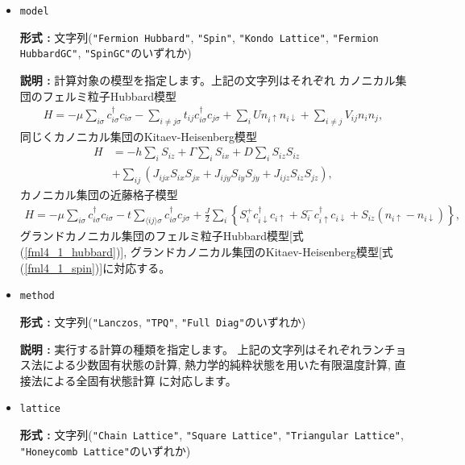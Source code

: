 \begin{itemize}

\item \verb|model|

{\bf 形式 :} 文字列(\verb|"Fermion Hubbard"|, \verb|"Spin"|, \verb|"Kondo Lattice"|, 
\verb|"Fermion HubbardGC"|, \verb|"SpinGC"|のいずれか)

{\bf 説明 :} 計算対象の模型を指定します。上記の文字列はそれぞれ
カノニカル集団のフェルミ粒子Hubbard模型
\begin{align}
H = - \mu \sum_{i \sigma} c^\dagger_{i \sigma} c_{i \sigma} 
- \sum_{i \neq j \sigma} t_{i j} c^\dagger_{i \sigma} c_{j \sigma} 
+ \sum_{i} U n_{i \uparrow} n_{i \downarrow}
+ \sum_{i \neq j} V_{i j} n_{i} n_{j},
\label{fml4_1_hubbard}
\end{align}
同じくカノニカル集団のKitaev-Heisenberg模型
\begin{align}
H &= -h \sum_{i} S_{i z} + \Gamma \sum_{i} S_{i x} + D \sum_{i} S_{i z} S_{i z}
\nonumber \\
&+ \sum_{i j} \left( J_{i j x} S_{i x} S_{j x} + J_{i j y} S_{i y} S_{j y} + J_{i j z} S_{i z} S_{j z} 
\right),
\label{fml4_1_spin}
\end{align}
カノニカル集団の近藤格子模型
\begin{align}
H = - \mu \sum_{i \sigma} c^\dagger_{i \sigma} c_{i \sigma} 
- t \sum_{\langle i j \rangle \sigma} c^\dagger_{i \sigma} c_{j \sigma} 
+ \frac{J}{2} \sum_{i} \left\{
S_{i}^{+} c_{i \downarrow}^\dagger c_{i \uparrow}
+ S_{i}^{-} c_{i \uparrow}^\dagger c_{i \downarrow}
+ S_{i z} (n_{i \uparrow} - n_{i \downarrow})
\right\},
\label{fml4_1_kondo}
\end{align}
グランドカノニカル集団のフェルミ粒子Hubbard模型[式(\ref{fml4_1_hubbard})],
グランドカノニカル集団のKitaev-Heisenberg模型[式(\ref{fml4_1_spin})]に対応する。

\item \verb|method|
  
{\bf 形式 :} 文字列(\verb|"Lanczos|, \verb|"TPQ"|, \verb|"Full Diag"|のいずれか)

{\bf 説明 :} 実行する計算の種類を指定します。
上記の文字列はそれぞれランチョス法による少数固有状態の計算, 
熱力学的純粋状態を用いた有限温度計算, 
直接法による全固有状態計算
に対応します。

\item \verb|lattice|

{\bf 形式 :} 文字列(\verb|"Chain Lattice"|, \verb|"Square Lattice"|, 
\verb|"Triangular Lattice"|, \verb|"Honeycomb Lattice"|のいずれか)


\end{itemize}
